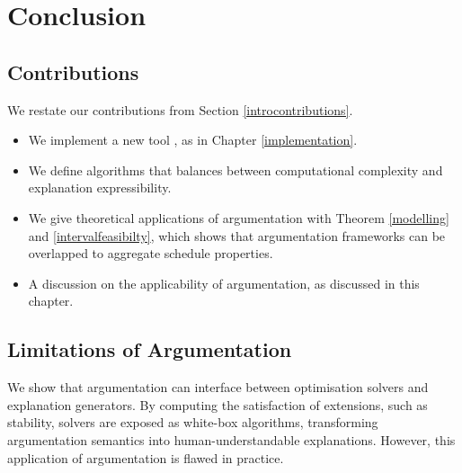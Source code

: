 \chapter{Conclusion}
\label{conclusion}

\section{Contributions}
We restate our contributions from Section \ref{introcontributions}.

\begin{itemize}
	\item We implement a new tool \emph{\toolname}, as in Chapter \ref{implementation}.
	\item We define algorithms that balances between computational complexity and explanation expressibility.
	\item We give theoretical applications of argumentation with Theorem \ref{modelling} and \ref{intervalfeasibilty}, which shows that argumentation frameworks can be overlapped to aggregate schedule properties.
	\item A discussion on the applicability of argumentation, as discussed in this chapter.
\end{itemize}

\section{Limitations of Argumentation}

We show that argumentation can interface between optimisation solvers and explanation generators. By computing the satisfaction of extensions, such as stability, solvers are exposed as white-box algorithms, transforming argumentation semantics into human-understandable explanations. However, this application of argumentation is flawed in practice. 

